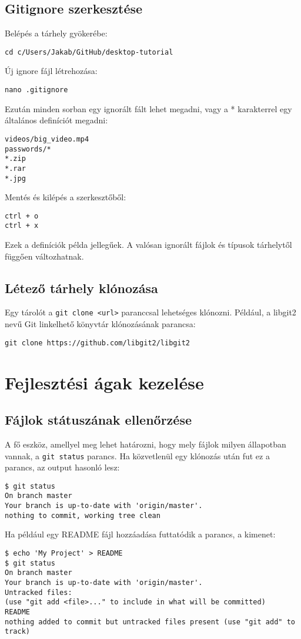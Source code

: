 \documentclass{article}
\begin{document}
\subsection*{Gitignore szerkesztése}
Belépés a tárhely gyökerébe:
\begin{lstlisting}
cd c/Users/Jakab/GitHub/desktop-tutorial
\end{lstlisting}
Új ignore fájl létrehozása:
\begin{lstlisting}
nano .gitignore
\end{lstlisting}
Ezután minden sorban egy ignorált fált lehet megadni, vagy a * karakterrel egy általános definíciót megadni:
\begin{lstlisting}
videos/big_video.mp4
passwords/*
*.zip
*.rar
*.jpg
\end{lstlisting}
Mentés és kilépés a szerkesztőből:
\begin{lstlisting}
ctrl + o
ctrl + x
\end{lstlisting}
Ezek a definíciók példa jellegűek. A valósan ignorált fájlok és típusok tárhelytől függően változhatnak.

\subsection*{Létező tárhely klónozása}
Egy tárolót a \texttt{git clone <url>} paranccsal lehetséges klónozni. Például, a libgit2 nevű Git linkelhető könyvtár klónozásának parancsa:
\begin{lstlisting}
git clone https://github.com/libgit2/libgit2
\end{lstlisting}

\section{Fejlesztési ágak kezelése}

\subsection*{Fájlok státuszának ellenőrzése}
A fő eszköz, amellyel meg lehet határozni, hogy mely fájlok milyen állapotban vannak, a \texttt{git status} parancs. Ha közvetlenül egy klónozás után fut ez a parancs, az output hasonló lesz:
\begin{lstlisting}
$ git status
On branch master
Your branch is up-to-date with 'origin/master'.
nothing to commit, working tree clean
\end{lstlisting}
\begin{minipage}{\linewidth}
Ha például egy README fájl hozzáadása futtatódik a parancs, a kimenet:
\begin{lstlisting}
$ echo 'My Project' > README
$ git status
On branch master
Your branch is up-to-date with 'origin/master'.
Untracked files:
(use "git add <file>..." to include in what will be committed)
README
nothing added to commit but untracked files present (use "git add" to track)
\end{lstlisting}
\end{minipage}
\end{document}
